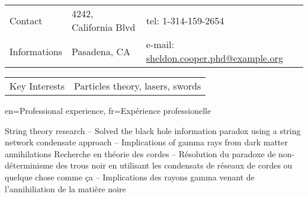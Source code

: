 \documentclass[letter]{article}
\author{Sheldon Cooper}
\begin{document}
\maketitle

\noindent
\begin{tabular}{p{3.5cm}p{8cm}p{7cm}}
{\small\sc Contact}       & 4242, California Blvd       & tel: 1-314-159-2654   \\
{\small\sc Informations}  & Pasadena, CA                & e-mail: \url{sheldon.cooper.phd@example.org} \vspace{0.5em}
\end{tabular}
\begin{tabular}{p{3.5cm}p{15cm}}
{\small\sc Key Interests} & Particles theory, lasers, swords \\
\end{tabular}

  
\begin{section}{en={Professional experience}, 
                fr={Expérience professionelle}}

    {String theory research \newline
     {\small
      \indent -- Solved the black hole information paradox using a string network condensate approach \newline
      \indent -- Implications of gamma rays from dark matter annihilations
     }
    }
    {Recherche en théorie des cordes \newline
     {\small
      \indent -- Résolution du paradoxe de non-déterminisme des trous noir en utilisant les condensats de réseaux de cordes ou quelque chose comme ça \newline
      \indent -- Implications des rayons gamma venant de l'annihiliation de la matière noire
     }
    }
\end{section}
\end{document}
